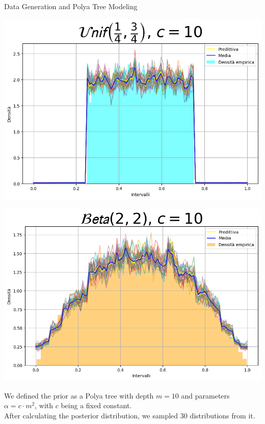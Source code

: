 \documentclass{beamer}
\begin{document}
\begin{frame}{Data Generation and Polya Tree Modeling}
\begin{minipage}{0.5\textwidth}
    \includegraphics[width=\textwidth]{Unif1.png}

    \bigskip
    
    \includegraphics[width=\textwidth]{Gaus1.png}

  \end{minipage}
  \hfill
  \begin{minipage}{0.45\textwidth}
    We defined the prior as a Polya tree with depth \( m = 10 \) and parameters \( \alpha = c \cdot m^2 \), with \( c \) being a fixed constant. \\
    
    After calculating the posterior distribution, we sampled 30 distributions from it.
  \end{minipage}
\end{frame}
\end{document}
